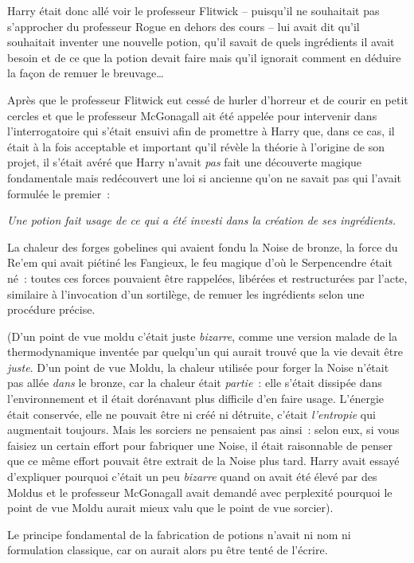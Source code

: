 Harry était donc allé voir le professeur Flitwick -- puisqu'il ne souhaitait pas s'approcher du professeur Rogue en dehors des cours -- lui avait dit qu'il souhaitait inventer une nouvelle potion, qu'il savait de quels ingrédients il avait besoin et de ce que la potion devait faire mais qu'il ignorait comment en déduire la façon de remuer le breuvage…

Après que le professeur Flitwick eut cessé de hurler d'horreur et de courir en petit cercles et que le professeur McGonagall ait été appelée pour intervenir dans l'interrogatoire qui s'était ensuivi afin de promettre à Harry que, dans ce cas, il était à la fois acceptable et important qu'il révèle la théorie à l'origine de son projet, il s'était avéré que Harry n'avait \emph{pas} fait une découverte magique fondamentale mais redécouvert une loi si ancienne qu'on ne savait pas qui l'avait formulée le premier~:

\emph{Une potion fait usage de ce qui a été investi dans la création de ses ingrédients.}

La chaleur des forges gobelines qui avaient fondu la Noise de bronze, la force du Re'em qui avait piétiné les Fangieux, le feu magique d'où le Serpencendre était né~: toutes ces forces pouvaient être rappelées, libérées et restructurées par l'acte, similaire à l'invocation d'un sortilège, de remuer les ingrédients selon une procédure précise.

(D'un point de vue moldu c'était juste \emph{bizarre}, comme une version malade de la thermodynamique inventée par quelqu'un qui aurait trouvé que la vie devait être \emph{juste}. D'un point de vue Moldu, la chaleur utilisée pour forger la Noise n'était pas allée \emph{dans} le bronze, car la chaleur était \emph{partie}~: elle s'était dissipée dans l'environnement et il était dorénavant plus difficile d'en faire usage. L'énergie était conservée, elle ne pouvait être ni créé ni détruite, c'était \emph{l'entropie} qui augmentait toujours. Mais les sorciers ne pensaient pas ainsi~: selon eux, si vous faisiez un certain effort pour fabriquer une Noise, il était raisonnable de penser que ce même effort pouvait être extrait de la Noise plus tard. Harry avait essayé d'expliquer pourquoi c'était un peu \emph{bizarre} quand on avait été élevé par des Moldus et le professeur McGonagall avait demandé avec perplexité pourquoi le point de vue Moldu aurait mieux valu que le point de vue sorcier).

Le principe fondamental de la fabrication de potions n'avait ni nom ni formulation classique, car on aurait alors pu être tenté de l'écrire.

